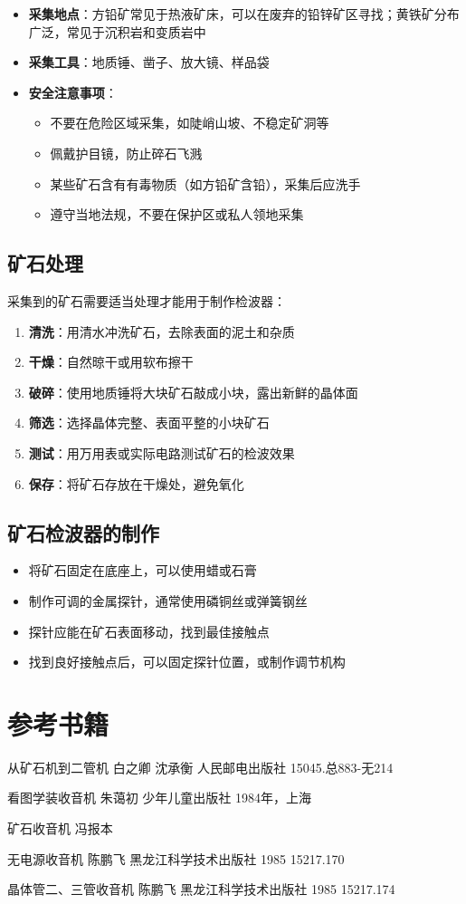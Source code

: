 \documentclass[12pt,UTF8]{ctexbook}
\begin{document}
\begin{itemize}[leftmargin=3.5em]
    \item \textbf{采集地点}：方铅矿常见于热液矿床，可以在废弃的铅锌矿区寻找；黄铁矿分布广泛，常见于沉积岩和变质岩中
    \item \textbf{采集工具}：地质锤、凿子、放大镜、样品袋
    \item \textbf{安全注意事项}：
        \begin{itemize}[leftmargin=3.5em]
            \item 不要在危险区域采集，如陡峭山坡、不稳定矿洞等
            \item 佩戴护目镜，防止碎石飞溅
            \item 某些矿石含有有毒物质（如方铅矿含铅），采集后应洗手
            \item 遵守当地法规，不要在保护区或私人领地采集
        \end{itemize}
\end{itemize}

\section{矿石处理}

采集到的矿石需要适当处理才能用于制作检波器：

\begin{enumerate}[leftmargin=3.5em]
    \item \textbf{清洗}：用清水冲洗矿石，去除表面的泥土和杂质
    \item \textbf{干燥}：自然晾干或用软布擦干
    \item \textbf{破碎}：使用地质锤将大块矿石敲成小块，露出新鲜的晶体面
    \item \textbf{筛选}：选择晶体完整、表面平整的小块矿石
    \item \textbf{测试}：用万用表或实际电路测试矿石的检波效果
    \item \textbf{保存}：将矿石存放在干燥处，避免氧化
\end{enumerate}

\section{矿石检波器的制作}

\begin{itemize}[leftmargin=3.5em]
    \item 将矿石固定在底座上，可以使用蜡或石膏
    \item 制作可调的金属探针，通常使用磷铜丝或弹簧钢丝
    \item 探针应能在矿石表面移动，找到最佳接触点
    \item 找到良好接触点后，可以固定探针位置，或制作调节机构
\end{itemize}

\chapter{参考书籍}

从矿石机到二管机  白之卿  沈承衡   人民邮电出版社 15045.总883-无214

看图学装收音机  朱蔼初  少年儿童出版社 1984年，上海

矿石收音机 冯报本

无电源收音机	    陈鹏飞	黑龙江科学技术出版社 1985	15217.170

晶体管二、三管收音机 陈鹏飞  黑龙江科学技术出版社 1985   15217.174
\end{document}
